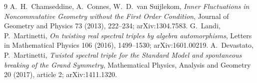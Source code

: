 \begin{thebibliography}{9}
A.~H.~Chamseddine, A.~Connes, W.~D.~van Suijlekom,
\emph{Inner Fluctuations in Noncommutative Geometry without the First Order Condition},
Journal of Geometry and Physics 73 (2013), 222--234; arXiv:1304.7583.
G.~Landi, P.~Martinetti,
\emph{On twisting real spectral triples by algebra automorphisms},
Letters in Mathematical Physics 106 (2016), 1499--1530; arXiv:1601.00219.
A.~Devastato, P.~Martinetti,
\emph{Twisted spectral triple for the Standard Model and spontaneous breaking of the Grand Symmetry},
Mathematical Physics, Analysis and Geometry 20 (2017), article 2;
arXiv:1411.1320.
\end{thebibliography}